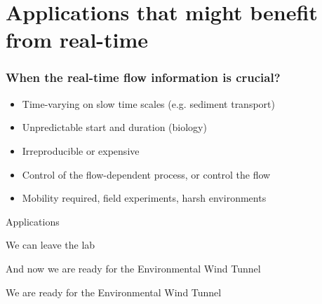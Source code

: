 %
% 
%
%
%
%
%

% 

\section{Applications that might benefit from real-time}


\begin{frame}[label=app-110]
\frametitle{When the real-time flow information is crucial?}
\begin{itemize}
	\item Time-varying on slow time scales (e.g. sediment transport)
    \item Unpredictable start and duration (biology) 
    \item Irreproducible or expensive %
	\item Control of the flow-dependent process, or control the flow %
    \item Mobility required, field experiments, harsh environments
\end{itemize}
\end{frame}

\begin{frame}[label=app-0]{Applications}
\centering{}
\end{frame}

\begin{frame}[label=app-112]{We can leave the lab}
\begin{multicols}{2}
\end{multicols}
\end{frame}


\begin{frame}[label=iibr-4]{And now we are ready for the Environmental Wind Tunnel}
\end{frame}
    
\begin{frame}[label=iibr-44]{We are ready for the Environmental Wind Tunnel}
  \centering{}
\end{frame}
    
